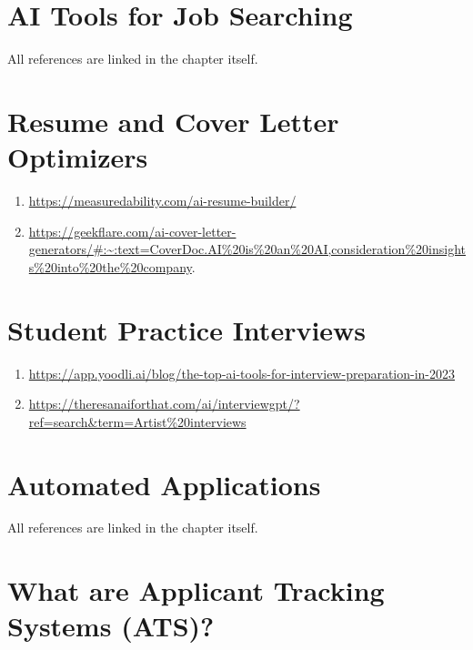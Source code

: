 \documentclass[
]{book}
\providecommand{\tightlist}{%
  \setlength{\itemsep}{0pt}\setlength{\parskip}{0pt}}
\begin{document}
\hypertarget{ai-tools-for-job-searching-1}{%
\section{AI Tools for Job Searching}\label{ai-tools-for-job-searching-1}}

All references are linked in the chapter itself.

\hypertarget{resume-and-cover-letter-optimizers-1}{%
\section{Resume and Cover Letter Optimizers}\label{resume-and-cover-letter-optimizers-1}}

\begin{enumerate}
\def\labelenumi{\arabic{enumi}.}
\tightlist
\item
  \url{https://measuredability.com/ai-resume-builder/}
\item
  \url{https://geekflare.com/ai-cover-letter-generators/\#:~:text=CoverDoc.AI\%20is\%20an\%20AI,consideration\%20insights\%20into\%20the\%20company}.
\end{enumerate}

\hypertarget{student-practice-interviews-1}{%
\section{Student Practice Interviews}\label{student-practice-interviews-1}}

\begin{enumerate}
\def\labelenumi{\arabic{enumi}.}
\tightlist
\item
  \url{https://app.yoodli.ai/blog/the-top-ai-tools-for-interview-preparation-in-2023}
\item
  \url{https://theresanaiforthat.com/ai/interviewgpt/?ref=search\&term=Artist\%20interviews}
\end{enumerate}

\hypertarget{automated-applications-1}{%
\section{Automated Applications}\label{automated-applications-1}}

All references are linked in the chapter itself.

\hypertarget{what-are-applicant-tracking-systems-ats-1}{%
\section{What are Applicant Tracking Systems (ATS)?}\label{what-are-applicant-tracking-systems-ats-1}}
\end{document}
